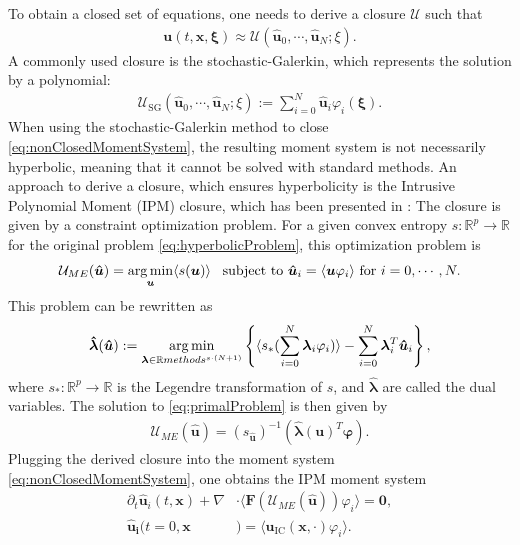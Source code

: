To obtain a closed set of equations, one needs to derive a closure $\mathcal{U}$ such that 
\begin{align*}
\bm{u}(t,\bm x,\bm \xi) \approx \mathcal{U}(\bm{\hat u}_0,\cdots,\bm{\hat u}_N;\xi).
\end{align*}
A commonly used closure is the stochastic-Galerkin, which represents the solution by a polynomial:
\begin{align*}
\mathcal{U}_{\text{SG}}(\bm{\hat u}_0,\cdots,\bm{\hat u}_N;\xi):= \sum_{i=0}^N \bm{\hat{u}}_i\varphi_i(\bm{\xi}).
\end{align*}
When using the stochastic-Galerkin method to close \eqref{eq:nonClosedMomentSystem}, the resulting moment system is not necessarily hyperbolic, meaning that it cannot be solved with standard methods. An approach to derive a closure, which ensures hyperbolicity is the Intrusive Polynomial Moment (IPM) closure, which has been presented in \cite{poette2009uncertainty}: The closure is given by a constraint optimization problem. For a given convex entropy $s:\mathbb{R}^p\to\mathbb{R}$ for the original problem \eqref{eq:hyperbolicProblem}, this optimization problem is
\begin{align}\label{eq:primalProblem}
\mathcal{U}_{ME}(\bm{\hat u}) = \operatorname*{arg\,min}_{\bm u} \langle s(\bm u) \rangle \enskip \text{ subject to } \bm{\hat u}_i = \langle \bm u \varphi_i \rangle \text{ for } i = 0,\cdots,N.
\end{align}
This problem can be rewritten as
\begin{align}\label{eq:dualProblem}
 \bm{\hat \lambda}(\bm{\hat u}) := \operatorname*{arg\,min}_{\bm{\lambda} \in \mathbb{R}methods^{s\cdot(N + 1)}}
  \left\{\langle s_*(\sum_{i=0}^{N}\bm{\lambda}_i \varphi_i)\rangle - \sum_{i=0}^{N}\bm{\lambda}_i^T \bm{\hat u}_i\right\},
\end{align}
where $s_*:\mathbb{R}^p\to\mathbb{R}$ is the Legendre transformation of $s$, and $\bm{ \hat\lambda}$ are called the dual variables. The solution to \eqref{eq:primalProblem} is then given by
\begin{align}\label{eq:ansatz}
 \mathcal{U}_{ME}(\bm{\hat u}) = \left( s_{\bm{\hat u}} \right)^{-1}(\bm{\hat{\lambda}}(\bm{u})^T \bm{\varphi}).
\end{align}
Plugging the derived closure into the moment system \eqref{eq:nonClosedMomentSystem}, one obtains the IPM moment system
\begin{subequations}\label{eq:IPMmomentSystem}
\begin{align}
\partial_t \bm{\hat u}_i(t,\bm{x}) + \nabla&\cdot\langle\bm{F}(\mathcal{U}_{ME}(\bm{\hat u})) \varphi_i\rangle = \bm{0}, \\
\bm{\hat u_i}(t=0,\bm{x}&) = \langle\bm{u}_{\text{IC}}(\bm{x},\cdot)\varphi_i\rangle.
\end{align}
\end{subequations}
